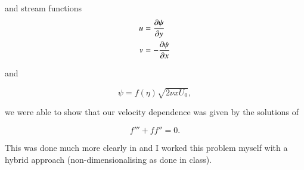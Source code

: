 and stream functions
\begin{align}\label{eqn:continuumFluidsReview:2550}
u &= \frac{\partial {\psi}}{\partial {y}} \\
v &= -\frac{\partial {\psi}}{\partial {x}}
\end{align}

and

\begin{equation}\label{eqn:continuumFluidsReview:2570}
\psi = f(\eta) \sqrt{ 2 \nu x U_0 },
\end{equation}

we were able to show that our velocity dependence was given by the solutions of

\begin{equation}\label{eqn:continuumFluidsReview:2590}
f''' + f f'' = 0.
\end{equation}

This was done much more clearly in \citep{acheson1990elementary} and I worked this problem myself with a hybrid approach (non-dimensionalising as done in class).


